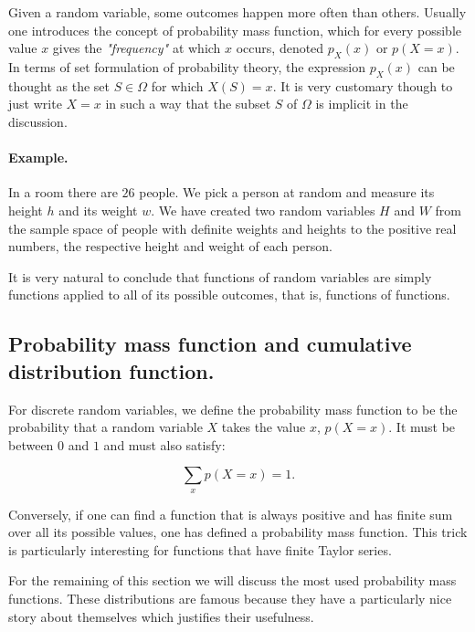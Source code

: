 \documentclass[12pt]{article}
\begin{document}
Given a random variable, some outcomes happen more often than others.
Usually one introduces the concept of probability mass function, which for every possible 
value $x$ gives the \textit{"frequency"} at which $x$ occurs, denoted $p_{X}(x)$ or $p(X = x)$.
In terms of set formulation of probability theory, the expression $p_{X}(x)$ can be thought as
the set $S \in \Omega$ for which $X(S) = x$.
It is very customary though to just write $X = x$ in such a way that the subset $S$ of $\Omega$ is 
implicit in the discussion.

\paragraph{Example.}
In a room there are $26$ people. We pick a person at random and measure its height $h$ and its weight
$w$. We have created two random variables $H$ and $W$ from the sample space of people with definite weights and heights
to the positive real numbers, the respective height and weight of each person.

\vspace{.5cm}
It is very natural to conclude that functions of random variables are simply functions applied to all of its possible outcomes,
that is, functions of functions.

\subsection{Probability mass function and cumulative distribution function.}

For discrete random variables, we define the probability mass function to be the 
probability that a random variable $X$ takes the value $x$, $p(X = x)$.
It must be between $0$ and $1$ and must also satisfy:

\begin{equation}
\sum_{x} p(X = x) = 1.
\end{equation}

\noindent
Conversely, if one can find a function that is always positive and has finite sum over all its possible 
values, one has defined a probability mass function. This trick is particularly interesting for functions
that have finite Taylor series.

For the remaining of this section we will discuss the most used probability mass functions.
These distributions are famous because they have a particularly nice story about themselves
which justifies their usefulness.
\end{document}
